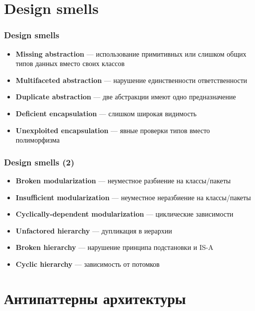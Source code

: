 \documentclass[xetex,mathserif,serif]{beamer}
\begin{document}
	\section{Design smells}

	\begin{frame}
		\frametitle{Design smells}
		\begin{itemize}
			\item \textbf{Missing abstraction} --- использование примитивных или слишком общих типов данных вместо своих классов
			\item \textbf{Multifaceted abstraction} --- нарушение единственности ответственности
			\item \textbf{Duplicate abstraction} --- две абстракции имеют одно предназначение
			\item \textbf{Deficient encapsulation} --- слишком широкая видимость
			\item \textbf{Unexploited encapsulation} --- явные проверки типов вместо полиморфизма
		\end{itemize}
	\end{frame}

	\begin{frame}
		\frametitle{Design smells (2)}
		\begin{itemize}
			\item \textbf{Broken modularization} --- неуместное разбиение на классы/пакеты
			\item \textbf{Insufficient modularization} --- неуместное неразбиение на классы/пакеты
			\item \textbf{Cyclically-dependent modularization} --- циклические зависимости
			\item \textbf{Unfactored hierarchy} --- дупликация в иерархии
			\item \textbf{Broken hierarchy} --- нарушение принципа подстановки и IS-A
			\item \textbf{Cyclic hierarchy} --- зависимость от потомков
		\end{itemize}
	\end{frame}

	\section{Антипаттерны архитектуры}
\end{document}
